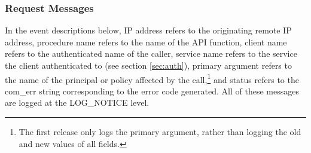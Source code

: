 \subsubsection{Request Messages}

In the event descriptions below, IP address refers to the originating
remote IP address, procedure name refers to the name of the API
function, client name refers to the authenticated name of the caller,
service name refers to the service the client authenticated to (see
section \ref{sec:auth}), primary argument refers to the name of the
principal or policy affected by the call,\footnote{The first release
only logs the primary argument, rather than logging the old and new
values of all fields.} and status refers to the com_err string
corresponding to the error code generated.  All of these messages are
logged at the LOG_NOTICE level.

